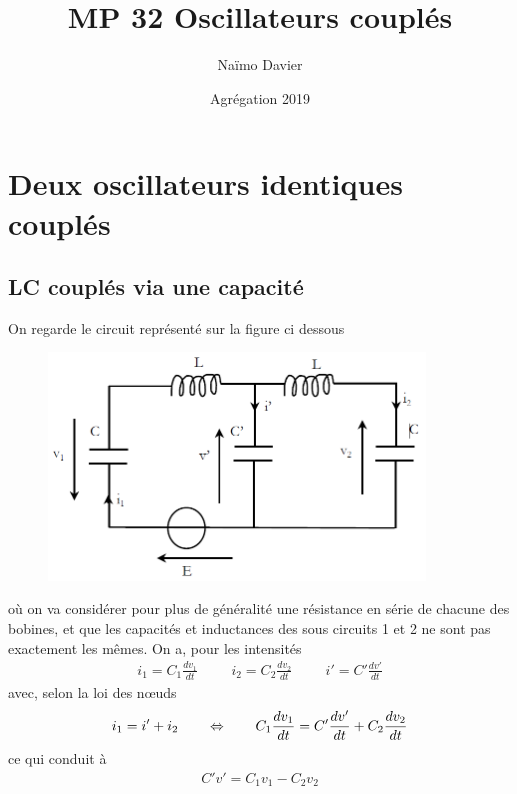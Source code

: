 \documentclass[12pt,prb,aps,epsf]{article}
\begin{document}
	
	\title{MP 32 Oscillateurs couplés}
	\author{Naïmo Davier}
	\date{Agrégation 2019}
	
	\maketitle
	
	\tableofcontents
	
	\pagebreak
	

\section{Deux oscillateurs identiques couplés}	
\subsection{LC couplés via une capacité}	
	On regarde le circuit représenté sur la figure ci dessous
\begin{figure}[h]
\centering \includegraphics[width=10cm]{RLCcouples}
\end{figure}
	où on va considérer pour plus de généralité une résistance en série de chacune des bobines, et que les capacités et inductances des sous circuits 1 et 2 ne sont pas exactement les mêmes. 
	On a, pour les intensités
	\begin{eqnarray}
	i_1 = C_1\frac{dv_1}{dt}\hspace{1cm} i_2 = C_2\frac{dv_2}{dt}\hspace{1cm} i' = C'\frac{dv'}{dt}
	\end{eqnarray}
	avec, selon la loi des nœuds 
	\begin{eqnarray}
	i_1 = i'+i_2\hspace{0.7cm} \Leftrightarrow \hspace{0.7cm} C_1\frac{dv_1}{dt} = C'\frac{dv'}{dt} + C_2\frac{dv_2}{dt}
	\end{eqnarray}
ce qui conduit à 
	\begin{eqnarray}
	 C'v' = C_1v_1 -C_2v_2
	\end{eqnarray}
\end{document}
